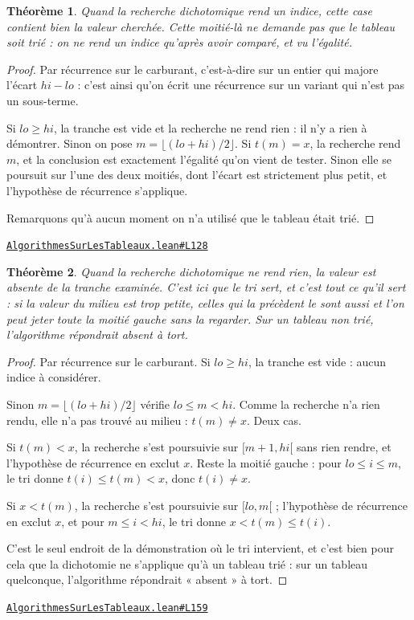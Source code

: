 \documentclass[11pt,a4paper]{article}
\theoremstyle{definition}
\theoremstyle{plain}
\newtheorem{theoreme}{Théorème}
\newcommand{\source}[2]{\par\smallskip\noindent\hfill{\footnotesize\href{#1}{\texttt{#2}}}\par\smallskip}
\begin{document}
\begin{theoreme}
Quand la recherche dichotomique rend un indice, cette case contient bien la
valeur cherchée. Cette moitié-là ne demande pas que le tableau soit trié : on ne rend
un indice qu'après avoir comparé, et vu l'égalité.
\end{theoreme}
\begin{proof}
Par récurrence sur le carburant, c'est-à-dire sur un entier qui majore l'écart
\(hi - lo\) : c'est ainsi qu'on écrit une récurrence sur un variant qui n'est pas un
sous-terme.

Si \(lo \ge hi\), la tranche est vide et la recherche ne rend rien : il n'y a rien à
démontrer. Sinon on pose \(m = \lfloor (lo+hi)/2 \rfloor\). Si \(t(m) = x\), la
recherche rend \(m\), et la conclusion est exactement l'égalité qu'on vient de tester.
Sinon elle se poursuit sur l'une des deux moitiés, dont l'écart est strictement plus
petit, et l'hypothèse de récurrence s'applique.

Remarquons qu'à aucun moment on n'a utilisé que le tableau était trié.
\end{proof}
\source{https://github.com/Commutator-IO/learn-lean/blob/main/courses/02-lycee/11-informatique-nsi/AlgorithmesSurLesTableaux.lean\#L128}{AlgorithmesSurLesTableaux.lean\#L128}

\begin{theoreme}
Quand la recherche dichotomique ne rend rien, la valeur est absente de la tranche
examinée. C'est ici que le tri sert, et c'est tout ce qu'il sert : si la valeur du
milieu est trop petite, celles qui la précèdent le sont aussi et l'on peut jeter
toute la moitié gauche sans la regarder. Sur un tableau non trié, l'algorithme
répondrait \og{} absent \fg{} à tort.
\end{theoreme}
\begin{proof}
Par récurrence sur le carburant. Si \(lo \ge hi\), la tranche est vide : aucun indice
à considérer.

Sinon \(m = \lfloor (lo+hi)/2 \rfloor\) vérifie \(lo \le m < hi\). Comme la recherche
n'a rien rendu, elle n'a pas trouvé au milieu : \(t(m) \ne x\). Deux cas.

Si \(t(m) < x\), la recherche s'est poursuivie sur \([m+1, hi[\) sans rien rendre, et
l'hypothèse de récurrence en exclut \(x\). Reste la moitié gauche : pour
\(lo \le i \le m\), le tri donne \(t(i) \le t(m) < x\), donc \(t(i) \ne x\).

Si \(x < t(m)\), la recherche s'est poursuivie sur \([lo, m[\) ; l'hypothèse de
récurrence en exclut \(x\), et pour \(m \le i < hi\), le tri donne
\(x < t(m) \le t(i)\).

C'est le seul endroit de la démonstration où le tri intervient, et c'est bien pour cela
que la dichotomie ne s'applique qu'à un tableau trié : sur un tableau quelconque,
l'algorithme répondrait « absent » à tort.
\end{proof}
\source{https://github.com/Commutator-IO/learn-lean/blob/main/courses/02-lycee/11-informatique-nsi/AlgorithmesSurLesTableaux.lean\#L159}{AlgorithmesSurLesTableaux.lean\#L159}
\end{document}
